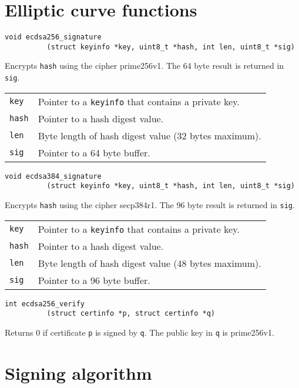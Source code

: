 \documentclass[12pt]{article}
\begin{document}
\section{Elliptic curve functions}

\bigskip
\bigskip
\begin{verbatim}
void ecdsa256_signature
          (struct keyinfo *key, uint8_t *hash, int len, uint8_t *sig)
\end{verbatim}

\noindent
Encrypts {\tt hash} using the cipher prime256v1.
The 64 byte result is returned in {\tt sig}.

\bigskip
\begin{tabular}{ll}
{\tt key} & Pointer to a {\tt keyinfo} that contains a private key.\\
{\tt hash} & Pointer to a hash digest value.\\
{\tt len} & Byte length of hash digest value (32 bytes maximum).\\
{\tt sig} & Pointer to a 64 byte buffer.
\end{tabular}

\bigskip
\bigskip
\begin{verbatim}
void ecdsa384_signature
          (struct keyinfo *key, uint8_t *hash, int len, uint8_t *sig)
\end{verbatim}

\noindent
Encrypts {\tt hash} using the cipher secp384r1.
The 96 byte result is returned in {\tt sig}.

\bigskip
\begin{tabular}{ll}
{\tt key} & Pointer to a {\tt keyinfo} that contains a private key.\\
{\tt hash} & Pointer to a hash digest value.\\
{\tt len} & Byte length of hash digest value (48 bytes maximum).\\
{\tt sig} & Pointer to a 96 byte buffer.
\end{tabular}

\bigskip
\bigskip
\begin{verbatim}
int ecdsa256_verify
          (struct certinfo *p, struct certinfo *q)
\end{verbatim}

\noindent
Returns 0 if certificate {\tt p} is signed by {\tt q}.
The public key in {\tt q} is prime256v1.

\newpage
\section{Signing algorithm}
\end{document}
